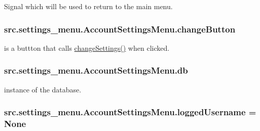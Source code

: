 Signal which will be used to return to the main menu. 

\hypertarget{classsrc_1_1settings__menu_1_1_account_settings_menu_a6ad9267209290b0eaa3ef35191f81d82}{}
\subsubsection[{change\+Button}]{\setlength{\rightskip}{0pt plus 5cm}src.\+settings\+\_\+menu.\+Account\+Settings\+Menu.\+change\+Button}\label{classsrc_1_1settings__menu_1_1_account_settings_menu_a6ad9267209290b0eaa3ef35191f81d82}


is a buttton that calls \hyperlink{classsrc_1_1settings__menu_1_1_account_settings_menu_a10989536edbbe0db4fc03f2e5ccc8271}{change\+Settings()} when clicked. 

\hypertarget{classsrc_1_1settings__menu_1_1_account_settings_menu_a793f0abcc421d4f7e51d6ff02e3e86ea}{}
\subsubsection[{db}]{\setlength{\rightskip}{0pt plus 5cm}src.\+settings\+\_\+menu.\+Account\+Settings\+Menu.\+db}\label{classsrc_1_1settings__menu_1_1_account_settings_menu_a793f0abcc421d4f7e51d6ff02e3e86ea}


instance of the database. 

\hypertarget{classsrc_1_1settings__menu_1_1_account_settings_menu_a7cac3d6c4fd01c1d0c9e6cfcba8e8950}{}
\subsubsection[{logged\+Username}]{\setlength{\rightskip}{0pt plus 5cm}src.\+settings\+\_\+menu.\+Account\+Settings\+Menu.\+logged\+Username = None\hspace{0.3cm}{\ttfamily [static]}}\label{classsrc_1_1settings__menu_1_1_account_settings_menu_a7cac3d6c4fd01c1d0c9e6cfcba8e8950}


